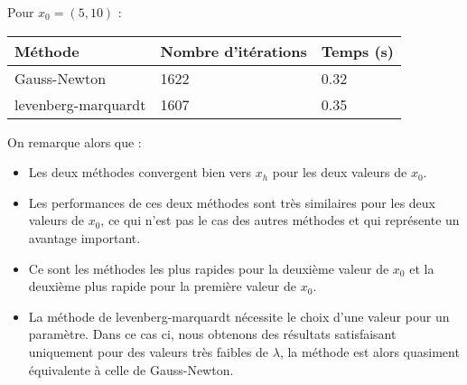\documentclass[12pt,a4paper,titlepage]{article}
\begin{document}
\begin{enumerate}
{            Pour $x_0 = (5,10)$ :

            \begin{table}[H]
                \begin{tabularx}{\textwidth}{ |l|X|X| }
                    \hline
                    Méthode & Nombre d'itérations & Temps (s) \\
                    \hline
                    Gauss-Newton & 1622 & 0.32 \\
                    \hline
                    levenberg-marquardt & 1607 & 0.35 \\
                    \hline
                \end{tabularx}
            \end{table}

            On remarque alors que :

            \begin{itemize}
                \item{Les deux méthodes convergent bien vers $x_h$ pour les deux valeurs de $x_0$.}
                \item{Les performances de ces deux méthodes sont très similaires pour les
                        deux valeurs de $x_0$, ce qui n'est pas le cas des autres méthodes et
                    qui représente un avantage important.}
                \item{Ce sont les méthodes les plus rapides pour la deuxième valeur de $x_0$ et
                    la deuxième plus rapide pour la première valeur de $x_0$.}
                \item{La méthode de levenberg-marquardt nécessite le choix d'une valeur pour
                        un paramètre. Dans ce cas ci, nous obtenons des résultats satisfaisant
                        uniquement pour des valeurs très faibles de $\lambda$, la méthode est 
                    alors quasiment équivalente à celle de Gauss-Newton.}
            \end{itemize}
        }

\end{enumerate}

\newpage
\end{document}
